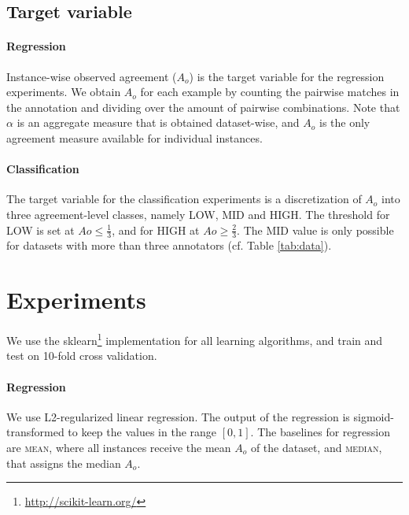 \documentclass[11pt,a4paper]{article}
\begin{document}
\subsection{Target variable}
\label{sec:targetvariable}
\paragraph*{Regression} Instance-wise observed agreement ($A_o$) is the target variable for the regression experiments. We obtain  $A_o$ for each example by counting the pairwise matches in the annotation and dividing over the amount of pairwise combinations. 
Note that  $\alpha$ is an aggregate measure that is obtained dataset-wise, and $A_o$ is the only agreement measure available for individual instances.

\paragraph*{Classification} The target variable for the classification experiments is a discretization of $A_o$ into three agreement-level classes, namely LOW, MID and HIGH. The threshold for LOW is set at $Ao \le \frac{1}{3}$, and for HIGH at $Ao \ge \frac{2}{3}$. The MID value is only possible for datasets with more than three annotators (cf. Table \ref{tab:data}).



\section{Experiments}
We use the sklearn\footnote{\url{http://scikit-learn.org/}} implementation for all learning algorithms, and train and test on 10-fold cross validation.
\paragraph{Regression} We use L2-regularized linear regression. The output of the regression is sigmoid-transformed to keep the values in the range $[0,1]$. The baselines for regression are \textsc{mean}, where all instances receive the mean $A_o$ of the dataset, and  \textsc{median}, that assigns the median $A_o$. 
\end{document}
